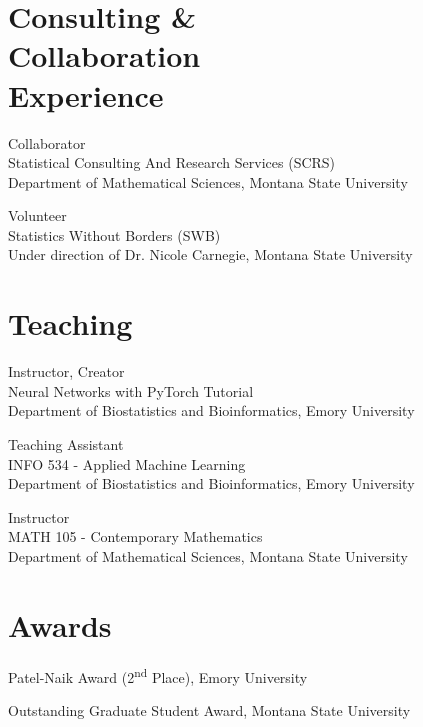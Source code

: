\documentclass{wm_cv}
\begin{document}
\section{Consulting \& \\ Collaboration \\ Experience}

Collaborator \hfill {} \\ 
    \indent \quad Statistical Consulting And Research Services (SCRS) \\
   \indent \quad Department of Mathematical Sciences, Montana State University

Volunteer \hfill {} \\ 
    \indent \quad Statistics Without Borders (SWB) \\
   \indent \quad Under direction of Dr. Nicole Carnegie, Montana State University


\section{Teaching}

Instructor, Creator \hfill {} \\ 
    \indent \quad Neural Networks with PyTorch Tutorial \\
   \indent \quad Department of Biostatistics and Bioinformatics, Emory University

Teaching Assistant \hfill {} \\ 
    \indent \quad INFO 534 - Applied Machine Learning  \\
   \indent \quad Department of Biostatistics and Bioinformatics, Emory University

Instructor \hfill {} \\ 
    \indent \quad MATH 105 - Contemporary Mathematics  \\
   \indent \quad Department of Mathematical Sciences, Montana State University


\section{Awards}

Patel-Naik Award (2\textsuperscript{nd} Place), Emory University \hfill {}

Outstanding Graduate Student Award, Montana State University \hfill {}  
\end{document}
